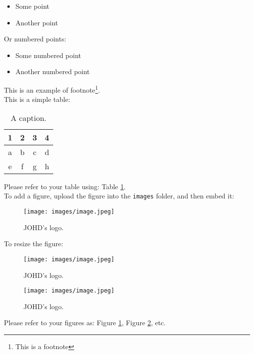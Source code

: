 \documentclass{article}
\begin{document}
\begin{itemize}
    \item Some point
    \item Another point
\end{itemize}

\noindent Or numbered points:

\begin{itemize}
    \item[1.] Some numbered point
    \item[2.] Another numbered point
\end{itemize}

\noindent This is an example of footnote\footnote{This is a footnote}. \\

\noindent This is a simple table:

\begin{table}[H]
\centering %
\caption{\label{tab1} A caption.}
\begin{tabular}{cccc}
\hline
1 & 2 & 3 & 4 \\
\hline
a & b & c & d\\
e & f & g & h\\
\hline
\end{tabular}
\end{table}

\noindent Please refer to your table using: Table \ref{tab1}.\\

\noindent To add a figure, upload the figure into the \texttt{images} folder, and then embed it:

\begin{figure}[H]
\centering
\texttt{[image: images/image.jpeg]}
\caption{\label{fig1}JOHD's logo.}
\end{figure}

\noindent To resize the figure:

\begin{figure}[H]
\centering
\texttt{[image: images/image.jpeg]}
\caption{\label{fig2}JOHD's logo.}
\end{figure}

\begin{figure}[H]
\centering
\texttt{[image: images/image.jpeg]}
\caption{\label{fig3}JOHD's logo.}
\end{figure}

\noindent Please refer to your figures as: Figure \ref{fig1}, Figure \ref{fig2}, etc.
\end{document}
